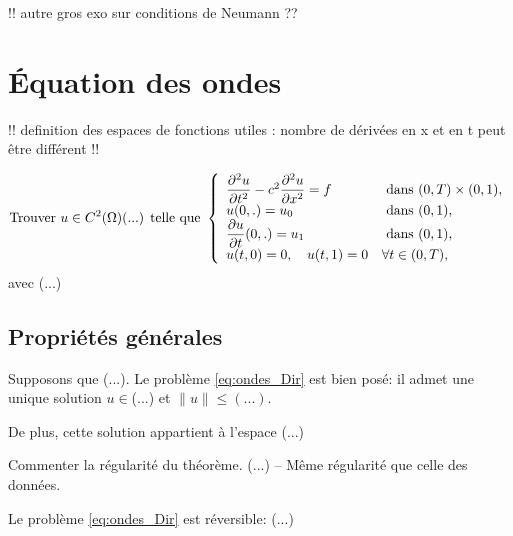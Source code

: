 \documentclass[12pt,a4paper,twoside]{article}
\begin{document}
!! autre gros exo sur conditions de Neumann ??

\section{\'Equation des ondes}

!! definition des espaces de fonctions utiles : nombre de d\'eriv\'ees en x et en t
peut \^etre diff\'erent !!

\begin{equation}
  \label{eq:ondes_Dir}
  \text{Trouver $u \in C^2(\Omega)$(...) telle que  }
  \left\{
    \begin{array}{l l}
      \dfrac{\partial^2 u}{\partial t^2} - c^2 \dfrac{\partial^2 u}{\partial x^2} = f 
      &\text{ dans } (0,T) \times (0,1) ,
      \\
      u(0,.) = u_0 
      & \text{ dans } (0,1) ,
      \\
      \dfrac{\partial u}{\partial t}(0,.) = u_1 
      & \text{ dans } (0,1) ,
      \\
      u(t,0) = 0 , \quad u(t,1) = 0 & \forall t \in (0,T) ,
    \end{array}
  \right.
\end{equation}
avec (...)


\subsection{Propri\'et\'es g\'en\'erales}

\begin{theorem}
  \label{thm:ondes_existence}
  Supposons que (...).
  Le probl\`eme \eqref{eq:ondes_Dir} est bien pos\'e:
  il admet une unique solution $u \in $(...)
  et $\| u \| \leq (...)$.

  De plus, cette solution appartient \`a l'espace (...)
\end{theorem}


\begin{remark}
  Commenter la r\'egularit\'e du th\'eor\`eme. (...)
  -- M\^eme r\'egularit\'e que celle des donn\'ees.
\end{remark}


\begin{proposition}
  Le probl\`eme \eqref{eq:ondes_Dir} est r\'eversible:
  (...)
\end{proposition}
\end{document}
